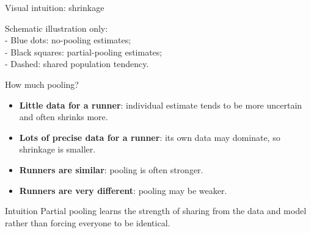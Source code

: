 \documentclass[aspectratio=43,11pt]{beamer}
\begin{document}
\begin{frame}{Visual intuition: shrinkage}
\begin{center}
\end{center}
{Schematic illustration only:\\
- Blue dots: no-pooling estimates;\\
- Black squares: partial-pooling estimates;\\
- Dashed: shared population tendency.}
\end{frame}

\begin{frame}{How much pooling?}
\begin{itemize}
\item \textbf{Little data for a runner}: individual estimate tends to be more uncertain and often shrinks more.
\item \textbf{Lots of precise data for a runner}: its own data may dominate, so shrinkage is smaller.
\item \textbf{Runners are similar}: pooling is often stronger.
\item \textbf{Runners are very different}: pooling may be weaker.
\end{itemize}
\begin{block}{Intuition}
Partial pooling learns the strength of sharing from the data and model rather than forcing everyone to be identical.
\end{block}
\end{frame}
\end{document}
